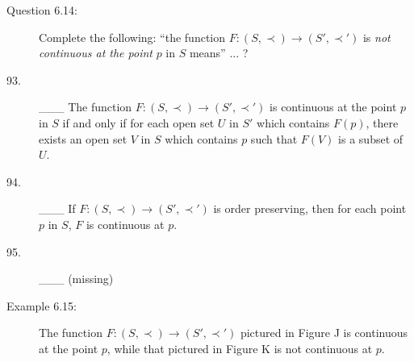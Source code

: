 \documentclass{book}
\begin{document}
\begin{description}
\item[Question 6.14:] Complete the following: ``the function $F: (S, \prec) \rightarrow (S', \prec ')$ is \emph{not continuous at the point} $p$ in $S$ means'' ... ?

\item[93.] \_\_\_ The function $F:(S, \prec) \rightarrow (S', \prec ')$ is continuous at the point $p$ in $S$ if and only if for each open set $U$ in $S'$ which contains $F(p)$, there exists an open set $V$ in $S$ which contains $p$ such that $F(V)$ is a subset of $U$.

\item[94.] \_\_\_ If $F: (S, \prec) \rightarrow (S', \prec ')$ is order preserving, then for each point $p$ in $S$, $F$ is continuous at $p$.

\item[95.] \_\_\_ (missing)

\item[Example 6.15:] The function $F: (S, \prec) \rightarrow (S', \prec ')$ pictured in Figure J is continuous at the point $p$, while that pictured in Figure K is not continuous at $p$.



\end{description}
\end{document}

